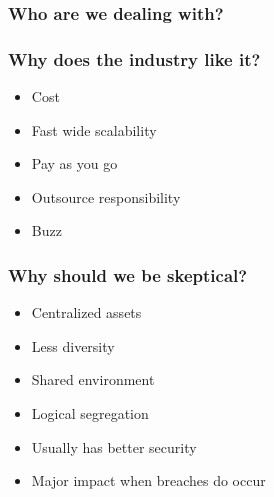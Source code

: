 \documentclass{beamer}
\begin{document}
\begin{frame}
    \frametitle{Who are we dealing with?}

\end{frame}

\begin{frame}
    \frametitle{Why does the industry like it?}
    \begin{itemize}
    \item Cost
    \item Fast wide scalability
    \item Pay as you go
    \item Outsource responsibility
    \item Buzz
    \end{itemize}
\end{frame}

\begin{frame}
    \frametitle{Why should we be skeptical?}
    \begin{itemize}
      \item Centralized assets
      \item Less diversity
      \item Shared environment
      \item Logical segregation
      \item Usually has better security
      \item Major impact when breaches do occur
    \end{itemize}
\end{frame}
\end{document}
